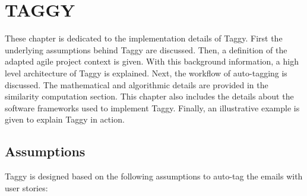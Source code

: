 \fancyhead[RO,LE]{\thepage}
\fancyfoot{} 
\chapter{TAGGY}
\label{ch:taggy}
These chapter is dedicated to the implementation details of Taggy. First the underlying assumptions behind Taggy are discussed. Then, a definition of the adapted agile project context is given. With this background information, a high level architecture of Taggy is explained. Next, the workflow of auto-tagging is discussed. The mathematical and algorithmic details are provided in the similarity computation section. This chapter also includes the details about the software frameworks used to implement Taggy. Finally, an illustrative example is given to explain Taggy in action.

\section{Assumptions}
Taggy is designed based on the following assumptions to auto-tag the emails with user stories:

